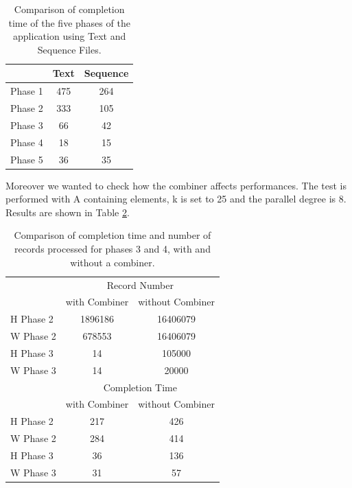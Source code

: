 \begin{table}
\begin{center}
\begin{tabular}{ | l || c | c | }
  \hline      
  & Text & Sequence \\
  \hline      
  Phase 1 & 475 & 264 \\
  Phase 2 & 333 & 105 \\
  Phase 3 & 66 & 42 \\ 
  Phase 4 & 18 & 15 \\
  Phase 5 & 36 & 35 \\
  \hline  
\end{tabular}
\end{center}
\label{tab:textvsSeq}
\caption{Comparison of completion time of the five phases of the application using Text and Sequence Files. }
\end{table}

Moreover we wanted to check how the combiner affects performances. 
The test is performed with A containing  elements, k is set to 25 and the parallel degree is 8.
Results are shown in Table \ref{comb_table}.

\begin{table}[h!]
\begin{center}

\begin{tabular}{ | l || c | c | }
  \hline      
  & \multicolumn{2}{|c|}{Record Number} \\
  & with Combiner & without Combiner \\
  \hline      
  H Phase 2 & 1896186 & 16406079 \\
  W Phase 2 & 678553 & 16406079 \\ 
  H Phase 3 & 14 & 105000 \\ 
  W Phase 3 & 14 & 20000 \\ 
 \hline  
  \hline      
  & \multicolumn{2}{|c|}{Completion Time} \\
  & with Combiner & without Combiner \\
  \hline      
  H Phase 2 & 217 & 426 \\
  W Phase 2 & 284 & 414 \\ 
  H Phase 3 & 36 & 136 \\ 
  W Phase 3 & 31 & 57 \\ 
 \hline  
\end{tabular}

\end{center}
\caption{Comparison of completion time and number of records processed for phases 3 and 4, with and without a combiner.}
\label{comb_table}
\end{table}














